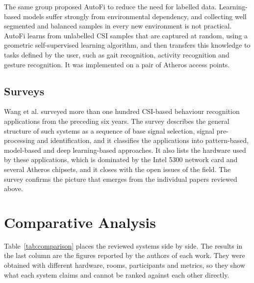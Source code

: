 The same group proposed AutoFi \cite{autofi} to reduce the need for labelled data. Learning-based models suffer strongly from environmental dependency, and collecting well segmented and balanced samples in every new environment is not practical. AutoFi learns from unlabelled CSI samples that are captured at random, using a geometric self-supervised learning algorithm, and then transfers this knowledge to tasks defined by the user, such as gait recognition, activity recognition and gesture recognition. It was implemented on a pair of Atheros access points.

\subsection{Surveys}
Wang et al. \cite{survey2019} surveyed more than one hundred CSI-based behaviour recognition applications from the preceding six years. The survey describes the general structure of such systems as a sequence of base signal selection, signal pre-processing and identification, and it classifies the applications into pattern-based, model-based and deep learning-based approaches. It also lists the hardware used by these applications, which is dominated by the Intel 5300 network card and several Atheros chipsets, and it closes with the open issues of the field. The survey confirms the picture that emerges from the individual papers reviewed above.

\section{Comparative Analysis}
\label{sec:comparison}
Table~\ref{tab:comparison} places the reviewed systems side by side. The results in the last column are the figures reported by the authors of each work. They were obtained with different hardware, rooms, participants and metrics, so they show what each system claims and cannot be ranked against each other directly.


